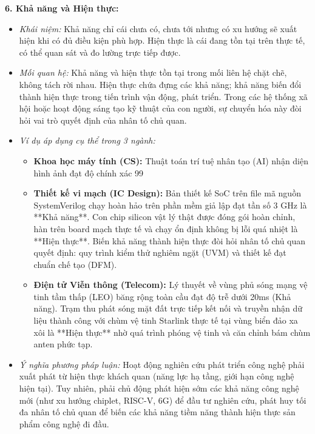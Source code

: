 \documentclass[12pt,a4paper]{article}
\begin{document}
{\noindent
\textbf{6. Khả năng và Hiện thực:}
\begin{itemize}
    \item \textit{Khái niệm:} Khả năng chỉ cái chưa có, chưa tới nhưng có xu hướng sẽ xuất hiện khi có đủ điều kiện phù hợp. Hiện thực là cái đang tồn tại trên thực tế, có thể quan sát và đo lường trực tiếp được.
    \item \textit{Mối quan hệ:} Khả năng và hiện thực tồn tại trong mối liên hệ chặt chẽ, không tách rời nhau. Hiện thực chứa đựng các khả năng; khả năng biến đổi thành hiện thực trong tiến trình vận động, phát triển. Trong các hệ thống xã hội hoặc hoạt động sáng tạo kỹ thuật của con người, sự chuyển hóa này đòi hỏi vai trò quyết định của nhân tố chủ quan.
    \item \textit{Ví dụ áp dụng cụ thể trong 3 ngành:}
    \begin{itemize}
        \item \textbf{Khoa học máy tính (CS):} Thuật toán trí tuệ nhân tạo (AI) nhận diện hình ảnh đạt độ chính xác 99%
        \item \textbf{Thiết kế vi mạch (IC Design):} Bản thiết kế SoC trên file mã nguồn SystemVerilog chạy hoàn hảo trên phần mềm giả lập đạt tần số 3 GHz là **Khả năng**. Con chip silicon vật lý thật được đóng gói hoàn chỉnh, hàn trên board mạch thực tế và chạy ổn định không bị lỗi quá nhiệt là **Hiện thực**. Biến khả năng thành hiện thực đòi hỏi nhân tố chủ quan quyết định: quy trình kiểm thử nghiêm ngặt (UVM) và thiết kế đạt chuẩn chế tạo (DFM).
        \item \textbf{Điện tử Viễn thông (Telecom):} Lý thuyết về vùng phủ sóng mạng vệ tinh tầm thấp (LEO) băng rộng toàn cầu đạt độ trễ dưới 20ms (Khả năng). Trạm thu phát sóng mặt đất trực tiếp kết nối và truyền nhận dữ liệu thành công với chùm vệ tinh Starlink thực tế tại vùng biển đảo xa xôi là **Hiện thực** nhờ quá trình phóng vệ tinh và căn chỉnh bám chùm anten phức tạp.
    \end{itemize}
    \item \textit{Ý nghĩa phương pháp luận:} Hoạt động nghiên cứu phát triển công nghệ phải xuất phát từ hiện thực khách quan (năng lực hạ tầng, giới hạn công nghệ hiện tại). Tuy nhiên, phải chủ động phát hiện sớm các khả năng công nghệ mới (như xu hướng chiplet, RISC-V, 6G) để đầu tư nghiên cứu, phát huy tối đa nhân tố chủ quan để biến các khả năng tiềm năng thành hiện thực sản phẩm công nghệ đi đầu.

\end{itemize}}
\end{document}
